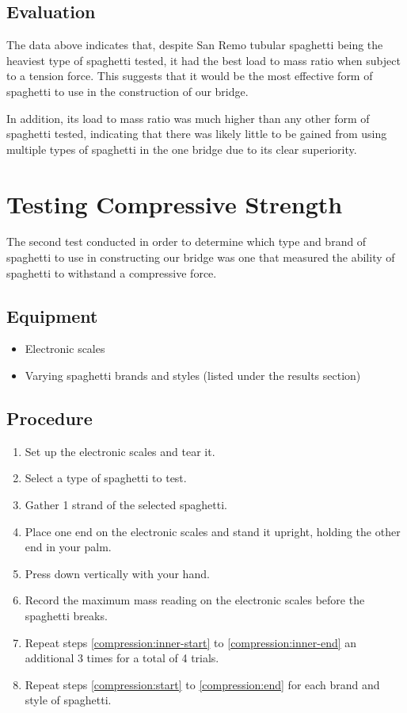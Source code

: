 \documentclass[a4paper,11pt]{article}
\begin{document}
\subsection{Evaluation}

The data above indicates that, despite San Remo tubular spaghetti being the
heaviest type of spaghetti tested, it had the best load to mass ratio when
subject to a tension force.
This suggests that it would be the most effective form of spaghetti to use in
the construction of our bridge.

In addition, its load to mass ratio was much higher than any other form of
spaghetti tested, indicating that there was likely little to be gained from
using multiple types of spaghetti in the one bridge due to its clear
superiority.




\section{Testing Compressive Strength}

The second test conducted in order to determine which type and brand of
spaghetti to use in constructing our bridge was one that measured the ability
of spaghetti to withstand a compressive force.


\subsection{Equipment}

\begin{itemize}
\item Electronic scales
\item Varying spaghetti brands and styles (listed under the results section)
\end{itemize}


\subsection{Procedure}

\begin{enumerate}
\item Set up the electronic scales and tear it.
\item \label{compression:start} Select a type of spaghetti to test.
\item \label{compression:inner-start} Gather 1 strand of the selected spaghetti.
\item Place one end on the electronic scales and stand it upright, holding the
	other end in your palm.
\item Press down vertically with your hand.
\item \label{compression:inner-end} Record the maximum mass reading on the
	electronic scales before the spaghetti breaks.
\item \label{compression:end} Repeat steps \ref{compression:inner-start} to
	\ref{compression:inner-end} an additional 3 times for a total of 4 trials.
\item Repeat steps \ref{compression:start} to \ref{compression:end} for each
	brand and style of spaghetti.
\end{enumerate}
\end{document}
